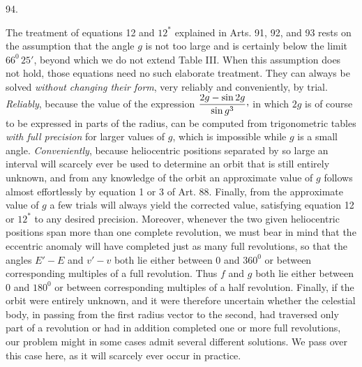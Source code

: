 \par{}\medskip
\hypertarget{native-127-article094}{}
\begin{center}94.\end{center}
The treatment of equations 12 and $12^{\ast}$ explained in Arts. 91, 92, and 93 rests on the assumption that the angle $g$ is not too large and is certainly below the limit $66^0\,25'$, beyond which we do not extend Table III. When this assumption does not hold, those equations need no such elaborate treatment. They can always be solved \textit{without changing their form}, very reliably and conveniently, by trial. \textit{Reliably}, because the value of the expression $\dfrac{2g-\sin 2g}{\sin g^3}\mathpunct{\raisebox{.45ex}{,}}$ in which $2g$ is of course to be expressed in parts of the radius, can be computed from trigonometric tables \textit{with full precision} for larger values of $g$, which is impossible while $g$ is a small angle. \textit{Conveniently}, because heliocentric positions separated by so large an interval will scarcely ever be used to determine an orbit that is still entirely unknown, and from any knowledge of the orbit an approximate value of $g$ follows almost effortlessly by equation 1 or 3 of Art. 88. Finally, from the approximate value of $g$ a few trials will always yield the corrected value, satisfying equation 12 or $12^{\ast}$ to any desired precision. Moreover, whenever the two given heliocentric positions span more than one complete revolution, we must bear in mind that the eccentric anomaly will have completed just as many full revolutions, so that the angles $E'-E$ and $v'-v$ both lie either between 0 and $360^0$ or between corresponding multiples of a full revolution. Thus $f$ and $g$ both lie either between 0 and $180^0$ or between corresponding multiples of a half revolution. Finally, if the orbit were entirely unknown, and it were therefore uncertain whether the celestial body, in passing from the first radius vector to the second, had traversed only part of a revolution or had in addition completed one or more full revolutions, our problem might in some cases admit several different solutions. We pass over this case here, as it will scarcely ever occur in practice.

